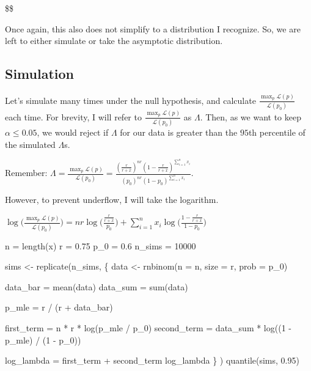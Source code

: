 \documentclass[
  letterpaper,
  DIV=11,
  numbers=noendperiod]{scrreprt}
\newenvironment{Shaded}{\begin{snugshade}}{\end{snugshade}}
\newcommand{\NormalTok}[1]{\textcolor[rgb]{0.00,0.23,0.31}{#1}}
\begin{document}
\$\$

Once again, this also does not simplify to a distribution I recognize.
So, we are left to either simulate or take the asymptotic distribution.

\subsection{Simulation}\label{simulation}

Let's simulate many times under the null hypothesis, and calculate
\(\frac{\max_{p} \mathcal{L}(p)}{\mathcal{L}(p_0)}\) each time. For
brevity, I will refer to
\(\frac{\max_{p} \mathcal{L}(p)}{\mathcal{L}(p_0)}\) as \(\Lambda\).
Then, as we want to keep \(\alpha \leq 0.05\), we would reject if
\(\Lambda\) for our data is greater than the \(95\)th percentile of the
simulated \(\Lambda\)s.

Remember:
\(\Lambda = \frac{\max_{p} \mathcal{L}(p)}{\mathcal{L}(p_0)} = \frac{(\frac{r}{r + \bar{x}})^{nr} (1 - \frac{r}{r + \bar{x}})^{\sum_{i=1}^n x_i}}{(p_0)^{nr} (1 - p_0)^{\sum_{i=1}^n x_i}}\).

However, to prevent underflow, I will take the logarithm.

\(\log \Big(\frac{\max_{p} \mathcal{L}(p)}{\mathcal{L}(p_0)} \Big) = nr \log \Big(\frac{\frac{r}{r + \bar{x}}}{p_0}\Big) + \sum_{i=1}^n x_i \log \Big( \frac{1-\frac{r}{r + \bar{x}}}{1-p_0} \Big)\)

\begin{Shaded}
\begin{Highlighting}[]
\NormalTok{n = length(x)}
\NormalTok{r = 0.75}
\NormalTok{p\_0 = 0.6}
\NormalTok{n\_sims = 10000}

\NormalTok{sims \textless{}{-} replicate(n\_sims, \{}
\NormalTok{    data \textless{}{-} rnbinom(n = n, size = r, prob = p\_0)}
    
\NormalTok{    data\_bar = mean(data)}
\NormalTok{    data\_sum = sum(data)}
    
\NormalTok{    p\_mle = r / (r + data\_bar)}
    
\NormalTok{    first\_term = n * r * log(p\_mle / p\_0)}
\NormalTok{    second\_term = data\_sum * log((1 {-} p\_mle) / (1 {-} p\_0))}
    
\NormalTok{    log\_lambda = first\_term + second\_term}
\NormalTok{    log\_lambda}
\NormalTok{\}}
\NormalTok{)}
\NormalTok{quantile(sims, 0.95)}
\end{Highlighting}
\end{Shaded}
\end{document}
